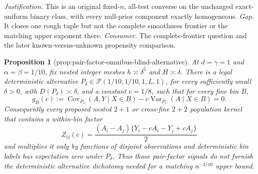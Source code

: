 \documentclass{article}
\newtheorem{proposition}{Proposition}
\begin{document}
\par\smallskip\noindent \textit{Justification.} This is an original fixed-\(n\), all-test converse on the unchanged exact-uniform binary class, with every null-prior component exactly homogeneous. \textit{Gap.} It closes one rough tuple but not the complete smoothness frontier or the matching upper exponent there. \textit{Consumer.} The complete-frontier question and the later known-versus-unknown propensity comparison.

\begin{proposition}[prop:pair-factor-omnibus-blind-alternative]\label{prop:pair-factor-omnibus-blind-alternative}
At \(d=\gamma=1\) and \(\alpha=\beta=1/10\), fix nested integer meshes \(h\asymp\delta^5\) and \(H\asymp\delta\).  There is a legal deterministic alternative \(P_\delta\in\mathcal P(1/10,1/10,1,L,1)\), for every sufficiently small \(\delta>0\), with \(D(P_\delta)\asymp\delta\), and a constant \(c=1/8\), such that for every fine bin \(B\),
\[
 g_B(c):=\operatorname{Cov}_{P_\delta}(A,Y\mid X\in B)
          -c\operatorname{Var}_{P_\delta}(A\mid X\in B)=0.
 \tag{37}
\]
Consequently every proposed nested \(2+1\) or cross-fine \(2+2\) population kernel that contains a within-bin factor
\[
 Z_{ij}(c)=\frac{(A_i-A_j)\{Y_i-cA_i-Y_j+cA_j\}}2
\]
and multiplies it only by functions of disjoint observations and deterministic bin labels has expectation zero under \(P_\delta\).  Thus those pair-factor signals do not furnish the deterministic alternative dichotomy needed for a matching \(n^{-3/10}\) upper bound.
\end{proposition}
\end{document}

